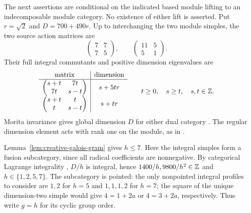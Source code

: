 The next assertions are conditional on the indicated based module lifting
to an indecomposable module category. No existence of either lift is
asserted. Put $r=\sqrt2$ and $D=700+490r$. Up to interchanging the two
module simples, the two source action matrices are
\[
 \begin{pmatrix}7&7\\7&5\end{pmatrix},\qquad
 \begin{pmatrix}11&5\\5&1\end{pmatrix}.
\]
Their full integral commutants and positive dimension eigenvalues are
\[
 \begin{array}{c|c}
 \text{matrix}&\text{dimension}\\\hline
 \begin{pmatrix}s+t&7t\\7t&s-t\end{pmatrix}&s+5tr\\[3pt]
 \begin{pmatrix}s+t&t\\t&s-t\end{pmatrix}&s+tr
 \end{array}
 \qquad t\geq0,\quad s\geq t,\quad s,t\in\mathbb Z.
\]
Morita invariance gives global dimension $D$ for either dual category
\cite[Corollary~7.16.7]{EGNO}. The regular dimension element acts with
rank one on the module, as in \cite[Exercise~7.16.8]{EGNO}.

Lemma~\ref{lem:creative-galois-gram} gives $h\leq7$. Here the integral
simples form a fusion subcategory, since all radical coefficients are
nonnegative. By categorical Lagrange integrality
\cite[Theorem~7.17.6]{EGNO}, $D/h$ is integral, hence
$1400/h,9800/h^2\in\mathbb Z$ and $h\in\{1,2,5,7\}$.
The subcategory is pointed: the only nonpointed integral profiles to
consider are $1,2$ for $h=5$ and $1,1,1,2$ for $h=7$; the square of the
unique dimension-two simple would give $4=1+2a$ or $4=3+2a$,
respectively. Thus write $g=h$ for its cyclic group order.


